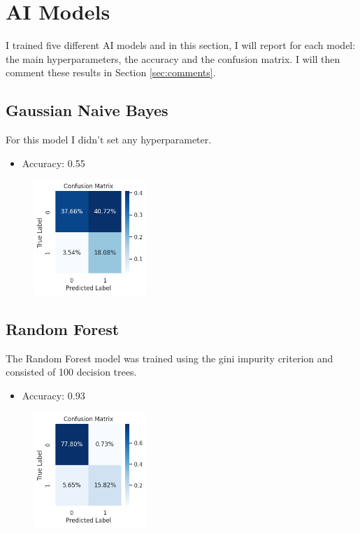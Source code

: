 \documentclass{article}
\begin{document}
\newpage

\section{AI Models}\label{sec:ai}
I trained five different AI models and in this section, I will report for each model: the main hyperparameters, the accuracy and the confusion matrix. I will then comment these results in Section \ref{sec:comments}.

\subsection{Gaussian Naive Bayes}\label{subsec:gnb}
For this model I didn't set any hyperparameter.
\begin{itemize}
\item Accuracy: 0.55
\end{itemize}
\begin{figure}[h!]    
    \includegraphics[width=0.38\textwidth]{gnb_cm.png}    
    \label{fig:gnb_cm}
\end{figure}

\subsection{Random Forest}\label{subsec:random-forest}
The Random Forest model was trained using the gini impurity criterion and consisted of 100 decision trees.
\begin{itemize}
\item Accuracy: 0.93
\end{itemize}
\begin{figure}[h!]    
    \includegraphics[width=0.38\textwidth]{rf_cm.png}    
    \label{fig:rf_cm}
\end{figure}
\end{document}
